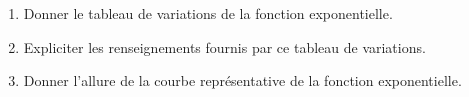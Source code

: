 
\begin{exercice}\label{exoanalyseCTU-0020}


\begin{enumerate}
\item Donner le tableau de variations de la fonction exponentielle.
\item Expliciter les renseignements fournis par ce tableau de variations.
\item Donner l'allure de la courbe représentative de la fonction exponentielle.
\end{enumerate}

\end{exercice}
